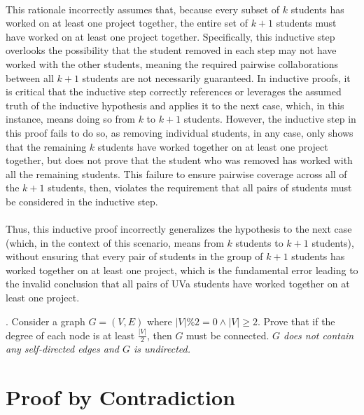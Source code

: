\documentclass[12pt]{article}
\newcounter{quesnum}
\newcommand{\question}[2][??]{
\begin{list}{\labelitemi}{\leftmargin=2em}
\item [\arabic{quesnum}.] {} {#2}
\end{list}
\addtocounter{quesnum}{1}
}
\begin{document}
\\
This rationale incorrectly assumes that, because every subset of $k$ students has worked on at least one project together, the entire set of $k+1$ students must have worked on at least one project together. Specifically, this inductive step overlooks the possibility that the  student removed in each step may not have worked with the other students, meaning the required pairwise collaborations between all $k+1$ students are not necessarily guaranteed. In inductive proofs, it is critical that the inductive step correctly references or leverages the assumed truth of the inductive hypothesis and applies it to the next case, which, in this instance, means doing so from $k$ to $k+1$ students. However, the inductive step in this proof fails to do so, as removing individual students, in any case, only shows that the remaining $k$ students have worked together on at least one project together, but does not prove that the student who was removed has worked with all the remaining students. This failure to ensure pairwise coverage across all of the $k+1$ students, then, violates the requirement that all pairs of students must be considered in the inductive step.\\
\\
Thus, this inductive proof incorrectly generalizes the hypothesis to the next case (which, in the context of this scenario, means from $k$ students to $k+1$ students), without ensuring that every pair of students in the group of $k+1$ students has worked together on at least one project, which is the fundamental error leading to the invalid conclusion that all pairs of UVa students have worked together on at least one project.

\vspace{12pt}


\question[3]{
Consider a graph $G=(V,E)$ where $|V| \% 2 = 0 \wedge |V| \geq 2$. Prove that if the degree of each node is at least $\frac{|V|}{2}$, then $G$ must be connected. \emph{$G$ does not contain any self-directed edges and $G$ is undirected.}
}

\vspace{12pt}

\section*{Proof by Contradiction}
\end{document}

